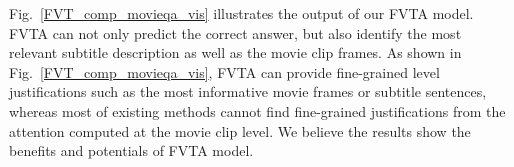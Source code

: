 Fig.~\ref{FVT_comp_movieqa_vis} illustrates the output of our FVTA model. FVTA can not only predict the correct answer, but also identify the most relevant subtitle description as well as the movie clip frames. As shown in Fig.~\ref{FVT_comp_movieqa_vis}, FVTA can provide fine-grained level justifications such as the most informative movie frames or subtitle sentences, whereas most of existing methods cannot find fine-grained justifications from the attention computed at the movie clip level. We believe the results show the benefits and potentials of FVTA model.











\begin{comment}
The level of difficulty of this dataset can also be indicated from the fact that the percentage of answers directly found in text metadata is 32\% on "What" questions and 46\% overall. It suggests that to find the correct answers, the system has to reason and come up with words or phrases that do not exist in the metadata most of the time.
\begin{table}[]
\centering
\caption{Percentage of answers found in text metadata excluding answers from "How many" questions.}
\label{memex-dataset}
\begin{tabular}{l||c}
\hline
Question Type       & Found in anywhere  \\ \hline \hline
what    & 32.61\%                  \\
when    & 70.86\%                    \\
where   & 48.36\%                      \\
who     & 55.82\%                   \\
overall & 46.09\%               \\
\hline
\end{tabular}
\end{table}
\end{comment}